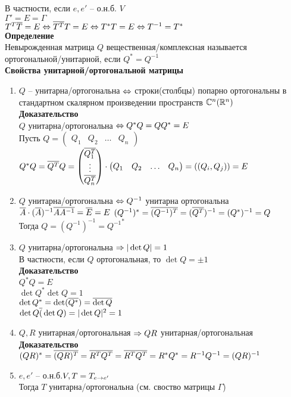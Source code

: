 \documentclass[12pt]{article}
\begin{document}
В частности, если $e, e'$ -- о.н.б. $V$\\
$\Gamma' = E = \Gamma$\\
$T^T \overline T = E \Leftrightarrow \overline{T^T}T = E \Leftrightarrow T^*T = E \Leftrightarrow T^{-1} = T^*$\\
\textbf{Определение}\\
Невырожденная матрица $Q$ вещественная/комплексная называется ортогональной/унитарной, если $Q^* = Q^{-1}$\\
\textbf{Свойства унитарной/ортогональной матрицы}
\begin{enumerate}
    \item $Q$ -- унитарна/ортогональна $\Leftrightarrow$ строки(столбцы) попарно ортогональны в стандартном скалярном произведении пространств $\mathbb{C}^n(\mathbb{R}^n)$\\
    \textbf{Доказательство}\\
    $Q$ унитарна/ортогональна $\Leftrightarrow Q^*Q = QQ^* = E$\\
    Пусть $Q = \begin{pmatrix}
        Q_1 & Q_2 & \ldots & Q_n
    \end{pmatrix}$\\
    $Q^*Q = \overline{Q^T}Q = \begin{pmatrix}
        \overline{Q_1^T}\\
        \vdots\\
        \overline{Q_n^T}
    \end{pmatrix}\cdot \begin{pmatrix}
        Q_1 & Q_2 & \ldots & Q_n
    \end{pmatrix} = ((Q_i, Q_j)) = E$
    \item $Q$ унитарна/ортогональна $\Leftrightarrow Q^{-1}$ унитарна ортогональна\\
    $\overline A \cdot (\overline{A})^{-1}\overline{AA^{-1}} = \overline E = E$
    $(Q^{-1})^* = \overline{(Q^{-1})^T}= (\overline{Q^T})^{-1} = (Q^*)^{-1} = Q$\\
    Тогда $Q = (Q^{-1})^{-1} = {Q^{-1}}^*$
    \item $Q$ унитарна/ортогональна $\Rightarrow |\det Q| = 1$\\
    В частности, если $Q$ ортогональная, то $\det Q = \pm 1$\\
    \textbf{Доказательство}\\
    $Q^*Q = E$\\
    $\det Q^* \det Q = 1$\\
    $\det Q^* = \det(\overline{Q^*}) = \overline{\det Q}$\\
    $\det Q \overline(\det Q) = |\det Q|^2 = 1$\\
    \item $Q, R$ унитарная/ортогональная $\Rightarrow QR$ унитарная/ортогональная\\
    \textbf{Доказательство}\\
    $(QR)^* = \overline{(QR)^T} = \overline {R^TQ^T} = \overline{R^T}\overline{Q^T} = R^*Q^* = R^{-1}Q^{-1}=(QR)^{-1}$\\
    \item $e,e'$ -- о.н.б.$V, T = T_{e\rightarrow e'}$\\
    Тогда $T$ унитарна/ортогональна (см. своство матрицы $\Gamma$)
\end{enumerate}
\end{document}
